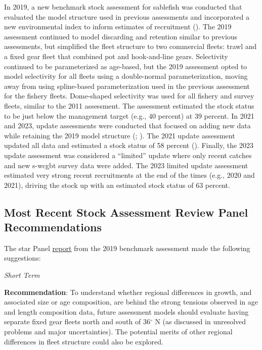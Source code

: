 \documentclass[
  english,
]{article}
\begin{document}
In 2019, a new benchmark stock assessment for sablefish was conducted
that evaluated the model structure used in previous assessments and
incorporated a new environmental index to inform estimates of
recruitment ().
The 2019 assessment continued to model discarding and retention similar
to previous assessments, but simplified the fleet structure to two
commercial fleets: trawl and a fixed gear fleet that combined pot and
hook-and-line gears. Selectivity continued to be parameterized as
age-based, but the 2019 assessment opted to model selectivity for all
fleets using a double-normal parameterization, moving away from using
spline-based parameterization used in the previous assessment for the
fishery fleets. Dome-shaped selectivity was used for all fishery and
survey fleets, similar to the 2011 assessment. The assessment estimated
the stock status to be just below the management target (e.g., 40
percent) at 39 percent. In 2021 and 2023, update assessments were
conducted that focused on adding new data while retaining the 2019 model
structure (;
). The 2021
update assessment updated all data and estimated a stock status of 58
percent (). Finally,
the 2023 update assessment was considered a ``limited'' update where
only recent catches and new \gls{s-wcgbt} survey data were added. The
2023 limited update assessment estimated very strong recent recruitments
at the end of the times (e.g., 2020 and 2021), driving the stock up with
an estimated stock status of 63 percent.

\subsection{Most Recent Stock Assessment Review Panel
Recommendations}\label{most-recent-stock-assessment-review-panel-recommendations}

The \gls{star} Panel
\href{https://www.pcouncil.org/documents/2019/10/sablefish-star-panel-report-july-8-12-2019.pdf/}{report}
from the 2019 benchmark assessment made the following suggestions:

\emph{Short Term}

\textbf{Recommendation}: To understand whether regional differences in
growth, and associated size or age composition, are behind the strong
tensions observed in age and length composition data, future assessment
models should evaluate having separate fixed gear fleets north and south
of 36\(^\circ\) N (as discussed in unresolved problems and major
uncertainties). The potential merits of other regional differences in
fleet structure could also be explored.
\end{document}
